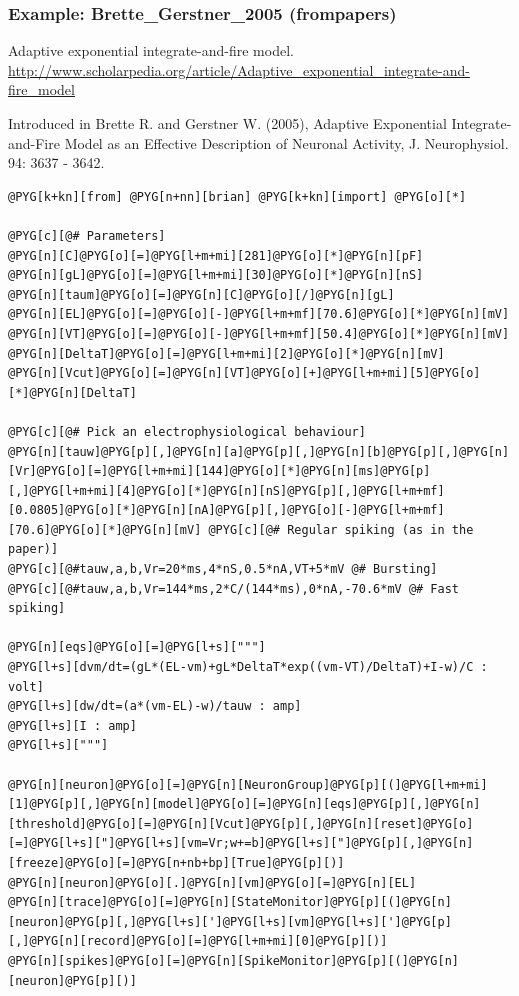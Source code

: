 \documentclass[letterpaper,10pt,english]{manual}
\begin{document}
\hypertarget{index-27}{}\subsubsection{Example: Brette\_Gerstner\_2005 (frompapers)}

Adaptive exponential integrate-and-fire model.
\href{http://www.scholarpedia.org/article/Adaptive\_exponential\_integrate-and-fire\_model}{http://www.scholarpedia.org/article/Adaptive\_exponential\_integrate-and-fire\_model}

Introduced in Brette R. and Gerstner W. (2005), Adaptive Exponential
Integrate-and-Fire Model as an Effective Description of Neuronal Activity,
J. Neurophysiol. 94: 3637 - 3642.

\begin{Verbatim}[commandchars=@\[\]]
@PYG[k+kn][from] @PYG[n+nn][brian] @PYG[k+kn][import] @PYG[o][*]

@PYG[c][@# Parameters]
@PYG[n][C]@PYG[o][=]@PYG[l+m+mi][281]@PYG[o][*]@PYG[n][pF]
@PYG[n][gL]@PYG[o][=]@PYG[l+m+mi][30]@PYG[o][*]@PYG[n][nS]
@PYG[n][taum]@PYG[o][=]@PYG[n][C]@PYG[o][/]@PYG[n][gL]
@PYG[n][EL]@PYG[o][=]@PYG[o][-]@PYG[l+m+mf][70.6]@PYG[o][*]@PYG[n][mV]
@PYG[n][VT]@PYG[o][=]@PYG[o][-]@PYG[l+m+mf][50.4]@PYG[o][*]@PYG[n][mV]
@PYG[n][DeltaT]@PYG[o][=]@PYG[l+m+mi][2]@PYG[o][*]@PYG[n][mV]
@PYG[n][Vcut]@PYG[o][=]@PYG[n][VT]@PYG[o][+]@PYG[l+m+mi][5]@PYG[o][*]@PYG[n][DeltaT]

@PYG[c][@# Pick an electrophysiological behaviour]
@PYG[n][tauw]@PYG[p][,]@PYG[n][a]@PYG[p][,]@PYG[n][b]@PYG[p][,]@PYG[n][Vr]@PYG[o][=]@PYG[l+m+mi][144]@PYG[o][*]@PYG[n][ms]@PYG[p][,]@PYG[l+m+mi][4]@PYG[o][*]@PYG[n][nS]@PYG[p][,]@PYG[l+m+mf][0.0805]@PYG[o][*]@PYG[n][nA]@PYG[p][,]@PYG[o][-]@PYG[l+m+mf][70.6]@PYG[o][*]@PYG[n][mV] @PYG[c][@# Regular spiking (as in the paper)]
@PYG[c][@#tauw,a,b,Vr=20*ms,4*nS,0.5*nA,VT+5*mV @# Bursting]
@PYG[c][@#tauw,a,b,Vr=144*ms,2*C/(144*ms),0*nA,-70.6*mV @# Fast spiking]

@PYG[n][eqs]@PYG[o][=]@PYG[l+s]["""]
@PYG[l+s][dvm/dt=(gL*(EL-vm)+gL*DeltaT*exp((vm-VT)/DeltaT)+I-w)/C : volt]
@PYG[l+s][dw/dt=(a*(vm-EL)-w)/tauw : amp]
@PYG[l+s][I : amp]
@PYG[l+s]["""]

@PYG[n][neuron]@PYG[o][=]@PYG[n][NeuronGroup]@PYG[p][(]@PYG[l+m+mi][1]@PYG[p][,]@PYG[n][model]@PYG[o][=]@PYG[n][eqs]@PYG[p][,]@PYG[n][threshold]@PYG[o][=]@PYG[n][Vcut]@PYG[p][,]@PYG[n][reset]@PYG[o][=]@PYG[l+s]["]@PYG[l+s][vm=Vr;w+=b]@PYG[l+s]["]@PYG[p][,]@PYG[n][freeze]@PYG[o][=]@PYG[n+nb+bp][True]@PYG[p][)]
@PYG[n][neuron]@PYG[o][.]@PYG[n][vm]@PYG[o][=]@PYG[n][EL]
@PYG[n][trace]@PYG[o][=]@PYG[n][StateMonitor]@PYG[p][(]@PYG[n][neuron]@PYG[p][,]@PYG[l+s][']@PYG[l+s][vm]@PYG[l+s][']@PYG[p][,]@PYG[n][record]@PYG[o][=]@PYG[l+m+mi][0]@PYG[p][)]
@PYG[n][spikes]@PYG[o][=]@PYG[n][SpikeMonitor]@PYG[p][(]@PYG[n][neuron]@PYG[p][)]


\end{Verbatim}
\end{document}
